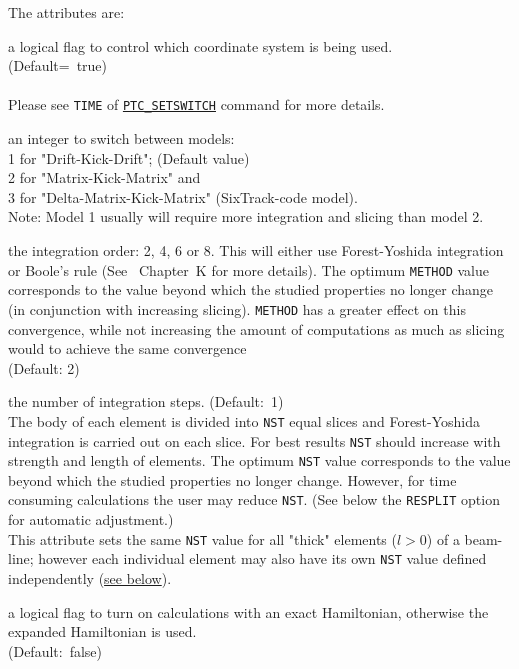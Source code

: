 The attributes are:
\begin{madlist}

   a logical flag to control which coordinate system
  is being used. \\ (Default=~true) \\ \\
  Please see \texttt{TIME} of \hyperref[sec:ptc-setswitch]{\texttt{PTC\_SETSWITCH}}
  command for more details.

   an integer to switch between models:\\
  1 for "Drift-Kick-Drift";  (Default value)\\
  2 for "Matrix-Kick-Matrix" and \\
  3 for "Delta-Matrix-Kick-Matrix" (SixTrack-code model). \\
  Note: Model 1 usually will require more integration and slicing than model 2.

   the integration order: 2, 4, 6 or 8. This will either use
  Forest-Yoshida integration or Boole's rule (See \cite{forest2002}~Chapter~K for 
  more details). The optimum \texttt{METHOD} value corresponds to
  the value beyond which the studied properties no longer change 
  (in conjunction with increasing slicing). \texttt{METHOD} has a greater effect
  on this convergence, while not increasing the amount of computations as much 
  as slicing would to achieve the same convergence \\ (Default: 2)

   the number of integration steps.  (Default:~1)\\
  The body of each element is divided into \texttt{NST} equal slices and
  Forest-Yoshida integration is carried out on each slice.
  For best results \texttt{NST} should increase with strength
  and length of elements. The optimum \texttt{NST} value corresponds to
  the value beyond which the studied properties no longer change.
  However, for time consuming calculations the user may
  reduce \texttt{NST}. (See below the \texttt{RESPLIT} option for automatic
  adjustment.)\\
  This attribute sets the same \texttt{NST} value  for all "thick" elements
  ($l > 0$) of a beam-line; however each individual element may also have
  its own \texttt{NST} value defined independently
  (\hyperref[sec:add-option-PTC]{see below}).

   a logical flag to turn on calculations with an exact
  Hamiltonian, otherwise the expanded Hamiltonian is used. \\
  (Default:~false)


\end{madlist}
